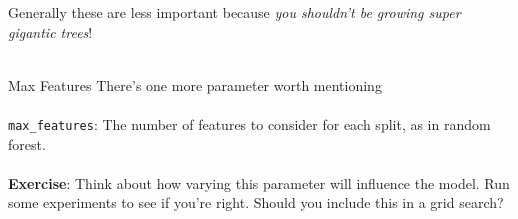 %
\begin{frame}
Generally these are less important because \textit{you shouldn't be growing super gigantic trees}!\\~\\


\end{frame}
%
\begin{frame}{Max Features}
There's one more parameter worth mentioning\\~\\

\texttt{max\_features}: The number of features to consider for each split, as in random forest.\\~\\

\textbf{Exercise}: Think about how varying this parameter will influence the model.  Run some experiments to see if you're right.  Should you include this in a grid search?
\end{frame}
  
  
